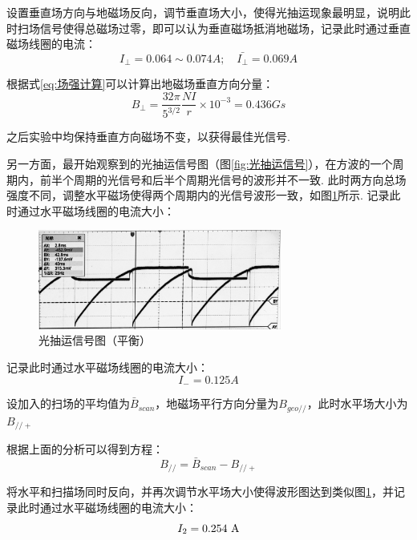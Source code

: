 \documentclass[10pt,hyperref,a4paper,UTF8]{ctexart}
\newcommand{\pll}{/\!/}
\begin{document}
                设置垂直场方向与地磁场反向，调节垂直场大小，使得光抽运现象最明显，说明此时扫场信号使得总磁场过零，即可以认为垂直磁场抵消地磁场，记录此时通过垂直磁场线圈的电流：
                $$
                        I_{\perp}=0.064 \sim 0.074\unit{A} ;\quad \bar{I_{\perp}}=0.069\unit{A}
                $$

                根据式\ref{eq:场强计算}可以计算出地磁场垂直方向分量：
                        \begin{equation*}
                        B_{\perp}=\frac{32\pi}{5^{3/2}}\frac{NI}{r}\times 10^{-3}=0.436\unit{Gs}
                        \end{equation*}

                之后实验中均保持垂直方向磁场不变，以获得最佳光信号. 

                另一方面，最开始观察到的光抽运信号图（图\ref{fig:光抽运信号}），在方波的一个周期内，前半个周期的光信号和后半个周期光信号的波形并不一致. 此时两方向总场强度不同，调整水平磁场使得两个周期内的光信号波形一致，如图\ref{fig:光抽运信号(平衡)}所示. 记录此时通过水平磁场线圈的电流大小：
                        \begin{figure}[htbp]\label{fig:光抽运信号(平衡)}
                                \centering
                                \includegraphics[width=8cm]{figures/IMAGE_2024-11-22_012840.jpg}
                                \caption{光抽运信号图（平衡）}
                        \end{figure}

                记录此时通过水平磁场线圈的电流大小：
                        $$I_{-}=0.125\unit{A}$$

                设加入的扫场的平均值为$\bar{B}_{scan}$，地磁场平行方向分量为$B_{geo\pll}$，此时水平场大小为$B_{\pll +}$

                根据上面的分析可以得到方程：
                        \begin{equation}\label{eq:地磁场平行方向分量1}
                                B_{\pll}=\bar{B}_{scan}-B_{\pll +}
                        \end{equation}

                将水平和扫描场同时反向，并再次调节水平场大小使得波形图达到类似图\ref{fig:光抽运信号(平衡)}，并记录此时通过水平磁场线圈的电流大小：
                        \begin{equation*}
                                I_{2}=0.254\ \rm A
                        \end{equation*}
\end{document}

